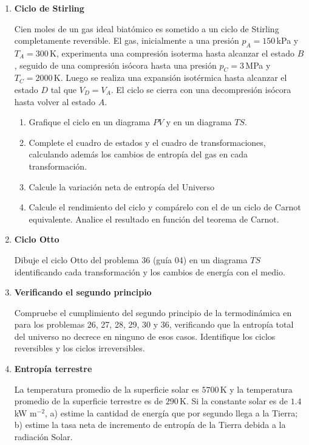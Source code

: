 \documentclass[a4paper,12pt]{article}
\begin{document}
\begin{enumerate}
	\item {\bf{Ciclo de Stirling}}

		Cien moles de un gas ideal biatómico es sometido a un ciclo de Stirling
		completamente reversible. El gas, inicialmente a una presión
		$p_A=150$\,kPa y $T_A=300$\,K, experimenta una compresión isoterma
		hasta alcanzar el estado $B$, seguido de una compresión isócora hasta
		una presión $p_C=3$\,MPa y $T_C=2000$\,K. Luego se realiza una
		expansión isotérmica hasta alcanzar el estado $D$ tal que $V_D=V_A$. El
		ciclo se cierra con una decompresión isócora hasta volver al estado
		$A$.
		\begin{enumerate}
			\item Grafique el ciclo en un diagrama $PV$ y en un diagrama $TS$.
			\item Complete el cuadro de estados y el cuadro de
				transformaciones, calculando además los cambios de entropía del
				gas en cada transformación.
			\item Calcule la variación neta de entropía del Universo
			\item Calcule el rendimiento del ciclo y compárelo con el de un
				ciclo de Carnot equivalente. Analice el resultado en función
				del teorema de Carnot.
		\end{enumerate}

	\item {\bf{Ciclo Otto}}

		Dibuje el ciclo Otto del problema 36 (guía 04) en un diagrama $TS$
		identificando cada transformación y los cambios de energía con el
		medio.

	\item {\bf{Verificando el segundo principio}}

		Compruebe el cumplimiento del segundo principio de la termodinámica en
		para los problemas 26, 27, 28, 29, 30 y 36, verificando que la entropía total
		del universo no decrece en ninguno de esos casos. Identifique los
		ciclos reversibles y los ciclos irreversibles.
	
	\item {\bf{Entropía terrestre}}

		La temperatura promedio de la superficie solar es $5700$\,K y la
		temperatura promedio de la superficie terrestre es de $290$\,K. Si la
		constante solar es de $1.4$\,kW m$^{-2}$, a) estime la cantidad de
		energía que por segundo llega a la Tierra; b) estime la tasa neta de
		incremento de entropía de la Tierra debida a la radiación Solar.


\end{enumerate}
\end{document}
